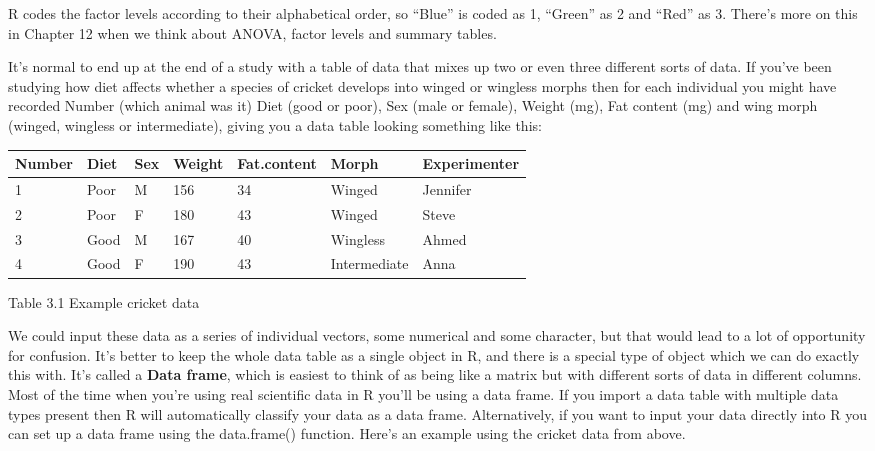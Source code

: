 \documentclass[
]{book}
\begin{document}
R codes the factor levels according to their alphabetical order, so ``Blue'' is coded as 1, ``Green'' as 2 and ``Red'' as 3. There's more on this in Chapter 12 when we think about ANOVA, factor levels and summary tables.

It's normal to end up at the end of a study with a table of data that mixes up two or even three different sorts of data. If you've been studying how diet affects whether a species of cricket develops into winged or wingless morphs then for each individual you might have recorded Number (which animal was it) Diet (good or poor), Sex (male or female), Weight (mg), Fat content (mg) and wing morph (winged, wingless or intermediate), giving you a data table looking something like this:

\begin{longtable}[]{@{}lllllll@{}}
\toprule
Number & Diet & Sex & Weight & Fat.content & Morph & Experimenter\tabularnewline
\midrule
\endhead
1 & Poor & M & 156 & 34 & Winged & Jennifer\tabularnewline
2 & Poor & F & 180 & 43 & Winged & Steve\tabularnewline
3 & Good & M & 167 & 40 & Wingless & Ahmed\tabularnewline
4 & Good & F & 190 & 43 & Intermediate & Anna\tabularnewline
\bottomrule
\end{longtable}

Table 3.1 Example cricket data

We could input these data as a series of individual vectors, some numerical and some character, but that would lead to a lot of opportunity for confusion. It's better to keep the whole data table as a single object in R, and there is a special type of object which we can do exactly this with. It's called a \textbf{Data frame}, which is easiest to think of as being like a matrix but with different sorts of data in different columns. Most of the time when you're using real scientific data in R you'll be using a data frame. If you import a data table with multiple data types present then R will automatically classify your data as a data frame. Alternatively, if you want to input your data directly into R you can set up a data frame using the data.frame() function. Here's an example using the cricket data from above.
\end{document}
